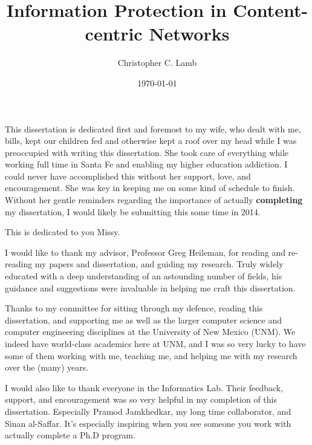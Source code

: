 \documentclass[botnum,fleqn,final]{unmeethesis}
\newcommand{\mytitle}{Information Protection in Content-centric Networks}
\newcommand{\myauthor}{Christopher C. Lamb}
\begin{document}
\frontmatter

\title{\mytitle}
\author{\myauthor}





\date{\today}

\maketitle

\makecopyright

\begin{dedication}
This dissertation is dedicated first and foremost to my wife, who dealt with me, bills, kept our children fed and otherwise kept a roof over my head while I was preoccupied with writing this dissertation.  She took care of everything while working full time in Santa Fe and enabling my higher education addiction.  I could never have accomplished this without her support, love, and encouragement.  She was key in keeping me on some kind of schedule to finish.  Without her gentle reminders regarding the importance of actually {\bf completing} my dissertation, I would likely be submitting this some time in 2014.

This is dedicated to you Missy.
\end{dedication}

\begin{acknowledgments}
   \vspace{1.1in}
I would like to thank my advisor, Professor Greg Heileman, for reading and re-reading my papers and dissertation, and guiding my research.  Truly widely educated with a deep understanding of an astounding number of fields, his guidance and suggestions were invaluable in helping me craft this dissertation.

Thanks to my committee for sitting through my defence, reading this dissertation, and supporting me as well as the larger computer science  and computer engineering disciplines at the University of New Mexico (UNM).  We indeed have world-class academics here at UNM, and I was so very lucky to have some of them working with me, teaching me, and helping me with my research over the (many) years.
   
I would also like to thank everyone in the Informatics Lab.  Their feedback, support, and encouragement was so very helpful in my completion of this dissertation.  Especially Pramod Jamkhedkar, my long time collaborator, and Sinan al-Saffar.  It's especially inspiring when you see someone you work with actually complete a Ph.D program.
\end{acknowledgments}
\end{document}
